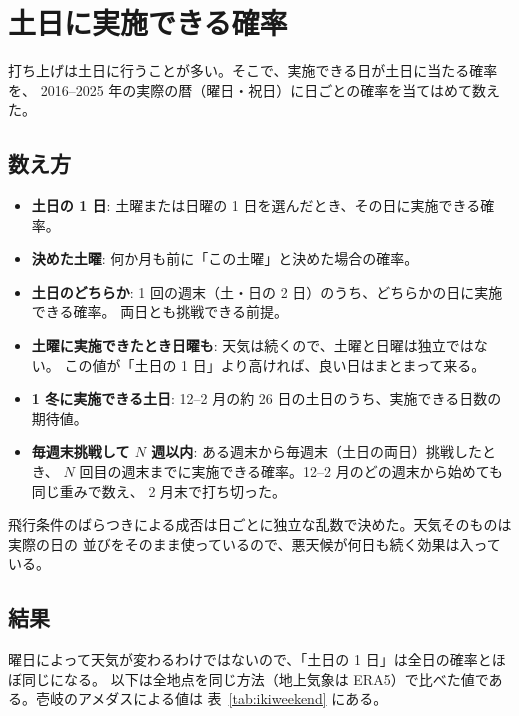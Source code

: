 \section{土日に実施できる確率}
\label{sec:weekend}

打ち上げは土日に行うことが多い。そこで、実施できる日が土日に当たる確率を、
2016--2025 年の実際の暦（曜日・祝日）に日ごとの確率を当てはめて数えた。

\subsection{数え方}

\begin{itemize}
  \item \textbf{土日の 1 日}: 土曜または日曜の 1 日を選んだとき、その日に実施できる確率。
  \item \textbf{決めた土曜}: 何か月も前に「この土曜」と決めた場合の確率。
  \item \textbf{土日のどちらか}: 1 回の週末（土・日の 2 日）のうち、どちらかの日に実施できる確率。
    両日とも挑戦できる前提。
  \item \textbf{土曜に実施できたとき日曜も}: 天気は続くので、土曜と日曜は独立ではない。
    この値が「土日の 1 日」より高ければ、良い日はまとまって来る。
  \item \textbf{1 冬に実施できる土日}: 12--2 月の約 26 日の土日のうち、実施できる日数の期待値。
  \item \textbf{毎週末挑戦して $N$ 週以内}: ある週末から毎週末（土日の両日）挑戦したとき、
    $N$ 回目の週末までに実施できる確率。12--2 月のどの週末から始めても同じ重みで数え、
    2 月末で打ち切った。
\end{itemize}

飛行条件のばらつきによる成否は日ごとに独立な乱数で決めた。天気そのものは実際の日の
並びをそのまま使っているので、悪天候が何日も続く効果は入っている。

\begin{table}[htbp]
\centering
\scriptsize
\caption{土日の確率。上が標準の飛行、下が短時間の飛行。}
\label{tab:weekend}
\resizebox{\linewidth}{!}{}
\end{table}

\subsection{結果}

曜日によって天気が変わるわけではないので、「土日の 1 日」は全日の確率とほぼ同じになる。
以下は全地点を同じ方法（地上気象は ERA5）で比べた値である。壱岐のアメダスによる値は
表~\ref{tab:ikiweekend} にある。

